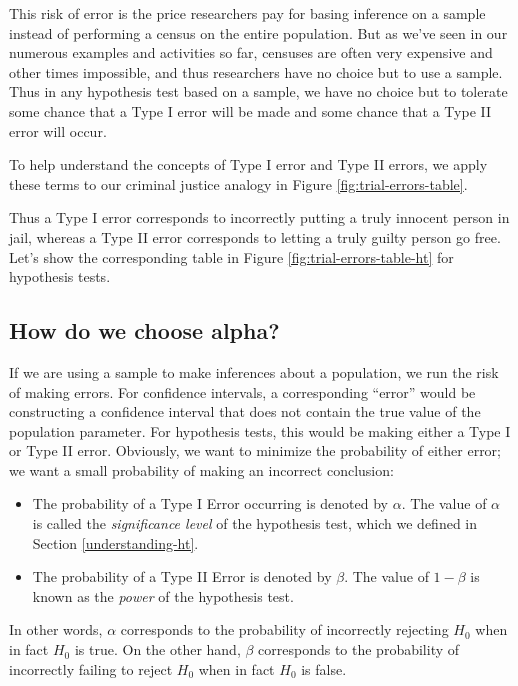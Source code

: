 \documentclass[
]{book}
\providecommand{\tightlist}{%
  \setlength{\itemsep}{0pt}\setlength{\parskip}{0pt}}
\begin{document}
This risk of error is the price researchers pay for basing inference on a sample instead of performing a census on the entire population. But as we've seen in our numerous examples and activities so far, censuses are often very expensive and other times impossible, and thus researchers have no choice but to use a sample. Thus in any hypothesis test based on a sample, we have no choice but to tolerate some chance that a Type I error will be made and some chance that a Type II error will occur.

To help understand the concepts of Type I error and Type II errors, we apply these terms to our criminal justice analogy in Figure \ref{fig:trial-errors-table}.

Thus a Type I error corresponds to incorrectly putting a truly innocent person in jail, whereas a Type II error corresponds to letting a truly guilty person go free. Let's show the corresponding table in Figure \ref{fig:trial-errors-table-ht} for hypothesis tests.

\hypertarget{choosing-alpha}{%
\subsection{How do we choose alpha?}\label{choosing-alpha}}

If we are using a sample to make inferences about a population, we run the risk of making errors. For confidence intervals, a corresponding ``error'' would be constructing a confidence interval that does not contain the true value of the population parameter. For hypothesis tests, this would be making either a Type I or Type II error. Obviously, we want to minimize the probability of either error; we want a small probability of making an incorrect conclusion:

\begin{itemize}
\tightlist
\item
  The probability of a Type I Error occurring is denoted by \(\alpha\). The value of \(\alpha\) is called the \emph{significance level} of the hypothesis test, which we defined in Section \ref{understanding-ht}.
\item
  The probability of a Type II Error is denoted by \(\beta\). The value of \(1-\beta\) is known as the \emph{power} of the hypothesis test.
\end{itemize}

In other words, \(\alpha\) corresponds to the probability of incorrectly rejecting \(H_0\) when in fact \(H_0\) is true. On the other hand, \(\beta\) corresponds to the probability of incorrectly failing to reject \(H_0\) when in fact \(H_0\) is false.
\end{document}
